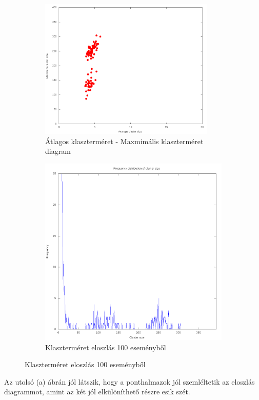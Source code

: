 \documentclass[a4paper,12pt]{article}
\begin{document}
\begin{figure}[H]
	\centering
	\begin{subfigure}{.49\textwidth}
		\includegraphics[width=0.92\textwidth]{mean-max18_120.png}
		\caption{ Átlagos klaszterméret - Maxmimális klaszterméret diagram }
	\end{subfigure}
	\begin{subfigure}{.49\textwidth}
		\includegraphics[width=.92\textwidth]{distribution_zoomed_18_120.png}
		\caption{ Klaszterméret eloszlás 100 eseményből } 
	\end{subfigure}
\end{figure}
\par Az utolsó (a) ábrán jól látszik, hogy a ponthalmazok jól szemléltetik az eloszlás diagrammot, amint az két jól elkülöníthető részre esik szét.
\end{document}
